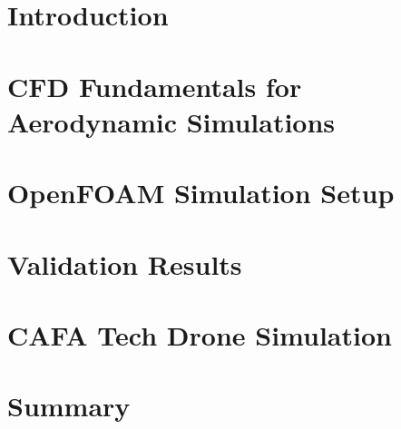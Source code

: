 

\chapter{Introduction}\label{chapter:introduction} %

\chapter{CFD Fundamentals for Aerodynamic Simulations}\label{chapter:method}


\chapter{OpenFOAM Simulation Setup}\label{chapter:results}


\chapter{Validation Results}\label{chapter:discussion}


\chapter{CAFA Tech Drone Simulation}\label{chapter:discussion}


\chapter{Summary}\label{chapter:summary} 


